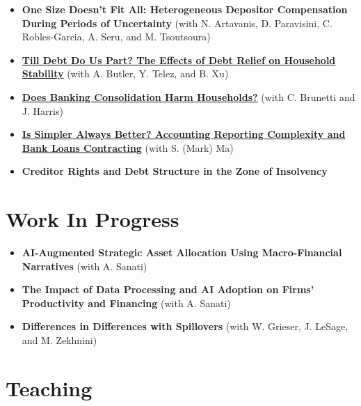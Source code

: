 \documentclass{article}[12]
\begin{document}
\begin{itemize}[itemsep=1.3em]
\item[$\bullet$] \textbf{One Size Doesn't Fit All: Heterogeneous Depositor Compensation During Periods of Uncertainty} (with N. Artavanis, D. Paravisini, C. Robles-Garcia, A. Seru, and M. Tsoutsoura)

\item[$\bullet$] \href{https://papers.ssrn.com/abstract=4497450}{\textbf{Till Debt Do Us Part? The Effects of Debt Relief on Household Stability}} (with A. Butler, Y. Telez, and B. Xu)

\item[$\bullet$] \href{https://papers.ssrn.com/abstract=6556342}{\textbf{Does Banking Consolidation Harm Households?}} (with C. Brunetti and J. Harris)

\item[$\bullet$] \href{https://www.dropbox.com/scl/fi/8iqvvc5gyedicj7dwnydo/Is-Simpler-Always-Better.pdf?rlkey=bghsqkmhv0ttvw6ovoioerkvr&dl=0}{\textbf{Is Simpler Always Better? Accounting Reporting Complexity and Bank Loans Contracting}} (with S. (Mark) Ma)

\item[$\bullet$] \textbf{Creditor Rights and Debt Structure in the Zone of Insolvency}
\end{itemize}


\section{Work In Progress}

\begin{itemize}[itemsep=1.3em]
\item[$\bullet$] \textbf{AI-Augmented Strategic Asset Allocation Using Macro-Financial Narratives} (with A. Sanati)

\item[$\bullet$] \textbf{The Impact of Data Processing and AI Adoption on Firms' Productivity and Financing} (with A. Sanati)

\item[$\bullet$] \textbf{Differences in Differences with Spillovers} (with W. Grieser, J. LeSage, and M. Zekhnini)
\end{itemize}


\section{Teaching}
\end{document}
